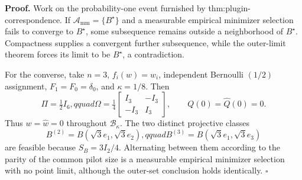 \textbf{Proof.}
Work on the probability-one event furnished by thm:plugin-correspondence.  If \(\mathcal A_{\mathrm{mm}}=\{B^\star\}\) and a measurable empirical minimizer selection fails to converge to \(B^\star\), some subsequence remains outside a neighborhood of \(B^\star\).  Compactness supplies a convergent further subsequence, while the outer-limit theorem forces its limit to be \(B^\star\), a contradiction.

For the converse, take \(n=3\), \(f_i(w)=w_i\), independent Bernoulli \((1/2)\) assignment, \(F_1=F_0=\delta_0\), and \(\kappa=1/8\).  Then
\[
 \Pi=\tfrac12I_6,qquad
 \Omega=\tfrac14\begin{bmatrix}I_3&-I_3\\-I_3&I_3\end{bmatrix},
 \qquad Q(0)=\widehat Q(0)=0.
\]
Thus \(w=\widehat w=0\) throughout \(\mathcal B_\kappa\).  The two distinct projective classes
\[
B^{(2)}=B(\sqrt3e_1,\sqrt3e_2),qquad
B^{(3)}=B(\sqrt3e_1,\sqrt3e_3)
\]
are feasible because \(S_B=3I_2/4\).  Alternating between them according to the parity of the common pilot size is a measurable empirical minimizer selection with no point limit, although the outer-set conclusion holds identically. \(\square\)